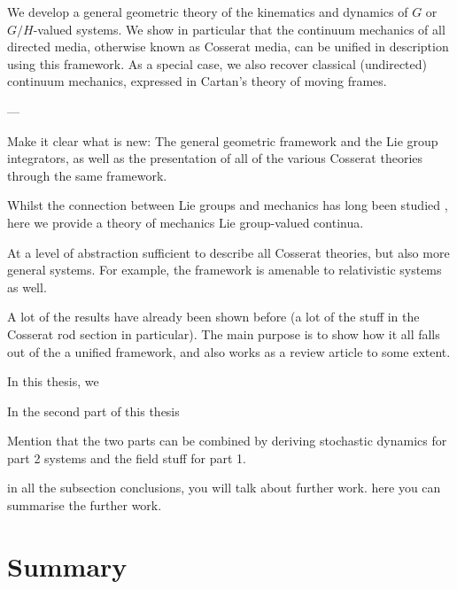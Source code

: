 \documentclass[]{cam-thesis}
\begin{document}
We develop a general geometric theory of the kinematics and dynamics of $G$ or $G/H$-valued systems. We show in particular that the continuum mechanics of all directed media, otherwise known as Cosserat media, can be unified in description using this framework. As a special case, we also recover classical (undirected) continuum mechanics, expressed in Cartan's theory of moving frames.

---

Make it clear what is new: The general geometric framework and the Lie group integrators, as well as the presentation of all of the various Cosserat theories through the same framework.

Whilst the connection between Lie groups and mechanics has long been studied \citep{marsdenIntroductionMechanicsSymmetry2013}, here we provide a theory of mechanics Lie group-valued continua.

At a level of abstraction sufficient to describe all Cosserat theories, but also more general systems. For example, the framework is amenable to relativistic systems as well.

A lot of the results have already been shown before (a lot of the stuff in the Cosserat rod section in particular). The main purpose is to show how it all falls out of the a unified framework, and also works as a review article to some extent.


 In this thesis, we 
 
 In the second part of this thesis
 
 Mention that the two parts can be combined by deriving stochastic dynamics for part 2 systems and the field stuff for part 1.

in all the subsection conclusions, you will talk about further work. here you can summarise the further work.






















\chapter*{Summary}
 
\end{document}
